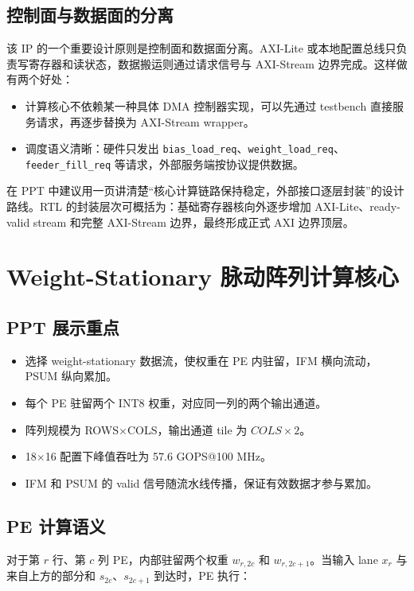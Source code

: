 \documentclass[fontset=fandol,ugly,language=chinese]{pkuthss}
\newcommand{\signal}[1]{\texttt{#1}}
\begin{document}
\section{控制面与数据面的分离}

该 IP 的一个重要设计原则是控制面和数据面分离。AXI-Lite 或本地配置总线只负责写寄存器和读状态，数据搬运则通过请求信号与 AXI-Stream 边界完成。这样做有两个好处：

\begin{itemize}
    \item 计算核心不依赖某一种具体 DMA 控制器实现，可以先通过 testbench 直接服务请求，再逐步替换为 AXI-Stream wrapper。
    \item 调度语义清晰：硬件只发出 \signal{bias\_load\_req}、\signal{weight\_load\_req}、\signal{feeder\_fill\_req} 等请求，外部服务端按协议提供数据。
\end{itemize}

在 PPT 中建议用一页讲清楚“核心计算链路保持稳定，外部接口逐层封装”的设计路线。RTL 的封装层次可概括为：基础寄存器核向外逐步增加 AXI-Lite、ready-valid stream 和完整 AXI-Stream 边界，最终形成正式 AXI 边界顶层。

\chapter{Weight-Stationary 脉动阵列计算核心}

\section{PPT 展示重点}

\begin{itemize}
    \item 选择 weight-stationary 数据流，使权重在 PE 内驻留，IFM 横向流动，PSUM 纵向累加。
    \item 每个 PE 驻留两个 INT8 权重，对应同一列的两个输出通道。
    \item 阵列规模为 ROWS$\times$COLS，输出通道 tile 为 $COLS\times2$。
    \item 18$\times$16 配置下峰值吞吐为 57.6 GOPS@100 MHz。
    \item IFM 和 PSUM 的 valid 信号随流水线传播，保证有效数据才参与累加。
\end{itemize}

\section{PE 计算语义}

对于第 $r$ 行、第 $c$ 列 PE，内部驻留两个权重 $w_{r,2c}$ 和 $w_{r,2c+1}$。当输入 lane $x_r$ 与来自上方的部分和 $s_{2c}$、$s_{2c+1}$ 到达时，PE 执行：
\end{document}
